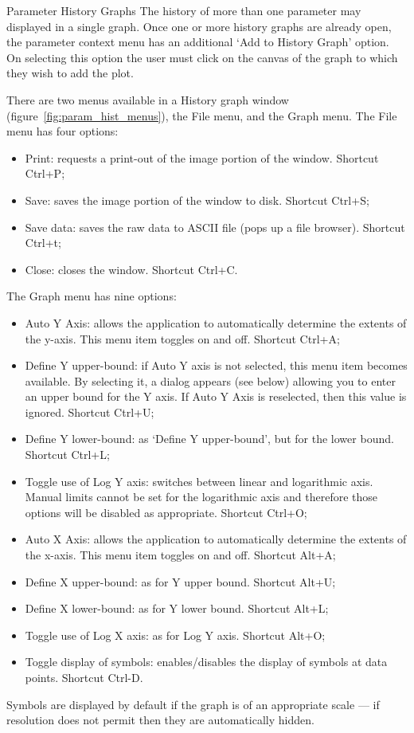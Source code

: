 \documentclass[a4paper,twoside]{article}
\begin{document}
\begin{section}{Parameter History Graphs}
The history of more than one parameter may displayed in a single
graph.  Once one or more history graphs are already open, the
parameter context menu has an additional `Add to History Graph'
option. On selecting this option the user must click on the canvas of
the graph to which they wish to add the plot.

There are two menus available in a History graph window 
(figure~\ref{fig:param_hist_menus}), the File menu, and the Graph
menu. The File menu has four options:
\begin{itemize}
\item Print: requests a print-out of the image portion of the window. 
Shortcut Ctrl+P;
\item Save: saves the image portion of the window to disk. Shortcut Ctrl+S;
\item Save data: saves the raw data to ASCII file (pops up a file browser). 
Shortcut Ctrl+t;
\item Close: closes the window. Shortcut Ctrl+C.
\end{itemize}
The Graph menu has nine options:
\begin{itemize}
\item Auto Y Axis: allows the application to automatically determine 
the extents of the y-axis. This menu item toggles on and off. 
Shortcut Ctrl+A;
\item Define Y upper-bound: if Auto Y axis is not selected, this 
menu item becomes available. By selecting it, a dialog appears 
(see below) allowing you to enter an upper bound for the Y axis. 
If Auto Y Axis is reselected, then this value is ignored. 
Shortcut Ctrl+U;
\item Define Y lower-bound: as `Define Y upper-bound', but for 
the lower bound. Shortcut Ctrl+L;
\item Toggle use of Log Y axis: switches between linear and 
logarithmic axis.  Manual limits cannot be set for the logarithmic 
axis and therefore those options will be disabled as appropriate. 
Shortcut Ctrl+O;
\item Auto X Axis: allows the application to automatically 
determine the extents of the x-axis. This menu item toggles on and 
off. Shortcut Alt+A;
\item Define X upper-bound: as for Y upper bound. Shortcut Alt+U;
\item Define X lower-bound: as for Y lower bound. Shortcut Alt+L;
\item Toggle use of Log X axis:	as for Log Y axis. Shortcut Alt+O;
\item Toggle display of symbols: enables/disables the display of 
symbols at data points. Shortcut Ctrl-D.
\end{itemize}
Symbols are displayed by default if the graph is of an appropriate
scale --- if resolution does not permit then they are automatically
hidden.


\end{section}
\end{document}
